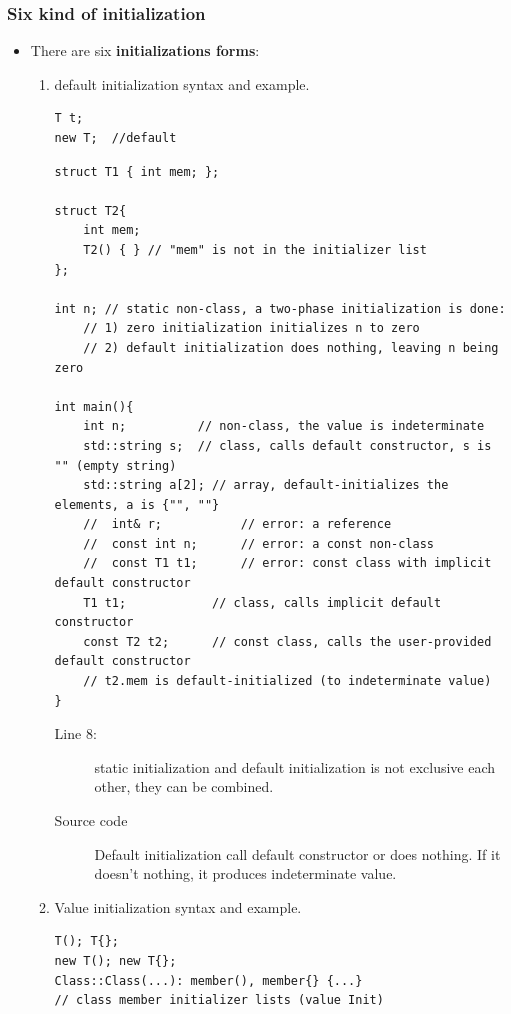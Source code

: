 \documentclass[a4paper,11pt,twoside]{book}
\begin{document}
\subsubsection{Six kind of initialization}
\begin{itemize}
	\item There are six \textbf{initializations forms}:
	\begin{enumerate}
		\item default initialization syntax and example.
\begin{lstlisting}[numbers=none]
T t;
new T;  //default
\end{lstlisting}

	
\begin{lstlisting}
struct T1 { int mem; };

struct T2{
	int mem;
	T2() { } // "mem" is not in the initializer list
};

int n; // static non-class, a two-phase initialization is done:
	// 1) zero initialization initializes n to zero
	// 2) default initialization does nothing, leaving n being zero

int main(){
	int n;          // non-class, the value is indeterminate
	std::string s;  // class, calls default constructor, s is "" (empty string)
	std::string a[2]; // array, default-initializes the elements, a is {"", ""}
	//  int& r;           // error: a reference
	//  const int n;      // error: a const non-class
	//  const T1 t1;      // error: const class with implicit default constructor
	T1 t1;            // class, calls implicit default constructor
	const T2 t2;      // const class, calls the user-provided default constructor
	// t2.mem is default-initialized (to indeterminate value)
}
\end{lstlisting}

\begin{description}
	\item[Line 8:] static initialization and default initialization is not exclusive each other, they can be combined. 
	\item[Source code] Default initialization call default constructor or does nothing. If it doesn't nothing, it produces indeterminate value.
\end{description}


		\item Value initialization syntax and example.
\begin{lstlisting}[numbers=none]
T(); T{};
new T(); new T{};
Class::Class(...): member(), member{} {...} 
// class member initializer lists (value Init)
\end{lstlisting}



\end{enumerate}
\end{itemize}
\end{document}
